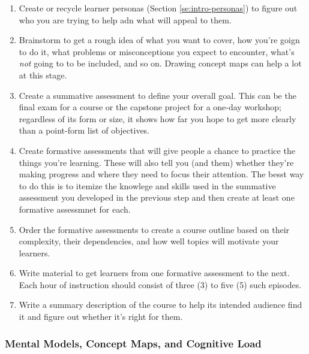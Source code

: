 \documentclass[010-intro.tex]{subfiles}
\begin{document}
        \begin{enumerate}[label=\textbf{L.\arabic*}]
            \item \label{enum:persona} Create or recycle learner personas (Section \ref{se:intro-personas})
                  to figure out who you are trying to help adn what will appeal to them.
            \item \label{enum:brainstorm} Brainstorm to get a rough idea of what you want to cover,
                  how you're goign to do it,
                  what problems or misconceptions you expect to encounter,
                  what's \emph{not} going to to be included, and so on.
                  Drawing concept maps can help a lot at this stage.
            \item \label{enum:summative} Create a summative assessment to define your overall goal.
                  This can be the final exam for a course or the capstone project for a one-day workshop;
                  regardless of its form or size, it shows how far you hope to get more clearly than a point-form list of objectives.
            \item \label{enum:formative} Create formative assessments that will give people a chance to practice the things you're learning.
                  These will also tell you (and them) whether they're making progress and where they need to focus their attention.
                  The besst way to do this is to itemize the knowlege and skills used in the summative assessment you developed in the previous step
                  and then create at least one formative assessmnet for each.
            \item \label{enum:outline} Order the formative assessments to create a course outline based on
                  their complexity, their dependencies, and how well topics will motivate your learners.
            \item \label{enum:content} Write material to get learners from one formative assessment to the next.
                  Each hour of instruction should consist of three (3) to five (5) such episodes.
            \item \label{enum:summary} Write a summary description of the course to help its intended audience find it and figure out whether it's right for them.
        \end{enumerate}

    \subsubsection{Mental Models, Concept Maps, and Cognitive Load}
        \label{sse:concept-maps}
\end{document}
